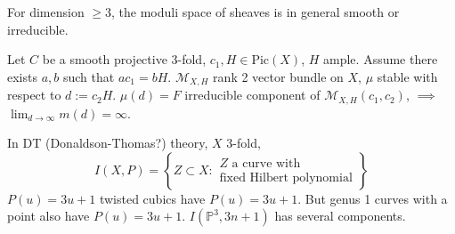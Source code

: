 For dimension $\geq 3$, the moduli space of sheaves is in general smooth or
irreducible.

\begin{theorem}[Ein]
\label{theorem-Ein}
Let $C$ be a smooth projective 3-fold, $c_1,H \in \text{Pic}(X)$, $H$ ample.
Assume there exists $a,b$ such that $ac_1=bH$. $\mathcal{M}_{X,H}$ rank 2 vector
bundle on $X$, $\mu$ stable with respect to $d:=c_2H$. $\mu(d)=F$ irreducible
component of $\mathcal{M}_{X,H}(c_1,c_2)$, $\implies $ 
$\lim_{d \to \infty} m(d)=\infty$.
\end{theorem}

\begin{example}
\label{example-}
In DT (Donaldson-Thomas?) theory, $X$ 3-fold,
$$
I(X,P)=\left\{Z \subset X: \substack{Z \text{ a curve with} \\ 
\text{fixed Hilbert polynomial}}\right\}
$$
$P(u)=3u+1$ twisted cubics have  $P(u)=3u+1$. But genus 1 curves with a
point also have  $P(u)=3u+1$. $I(\mathbb{P}^3,3n+1)$ has several components.
\end{example}





